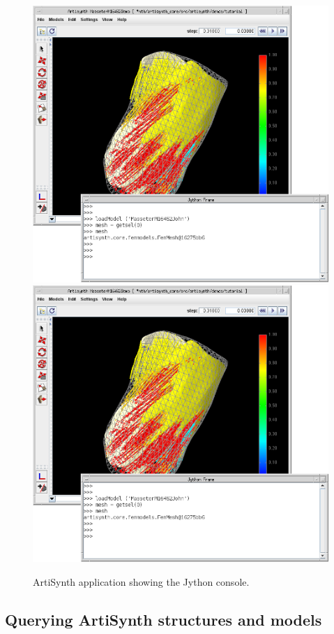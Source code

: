 \documentclass{article}
\begin{document}
\begin{figure}[t]
\begin{center}
\iflatexml
 \includegraphics[]{images/artisynthJython}
\else
 \includegraphics[width=4.5in]{images/artisynthJython}
\fi
\end{center}
\caption{ArtiSynth application showing the Jython console.}
\label{artisynthJython:fig}
\end{figure}

\subsection{Querying ArtiSynth structures and models}
\label{JythonQuerying:sec}
\end{document}
